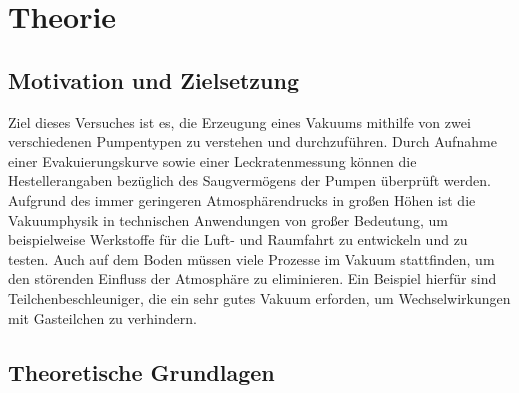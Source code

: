 \section{Theorie}
\label{sec:Theorie}

\subsection{Motivation und Zielsetzung}

Ziel dieses Versuches ist es, die Erzeugung eines Vakuums mithilfe von zwei
verschiedenen Pumpentypen zu verstehen und durchzuführen.
Durch Aufnahme einer Evakuierungskurve sowie einer Leckratenmessung können die
Hestellerangaben bezüglich des Saugvermögens der Pumpen überprüft werden.
Aufgrund des immer geringeren Atmosphärendrucks in großen Höhen ist die Vakuumphysik
in technischen Anwendungen von großer Bedeutung, um beispielweise Werkstoffe für
die Luft- und Raumfahrt zu entwickeln und zu testen.
Auch auf dem Boden müssen viele Prozesse im Vakuum stattfinden, um den störenden
Einfluss der Atmosphäre zu eliminieren. Ein Beispiel hierfür sind Teilchenbeschleuniger,
die ein sehr gutes Vakuum erforden, um Wechselwirkungen mit Gasteilchen zu verhindern.

\subsection{Theoretische Grundlagen}

